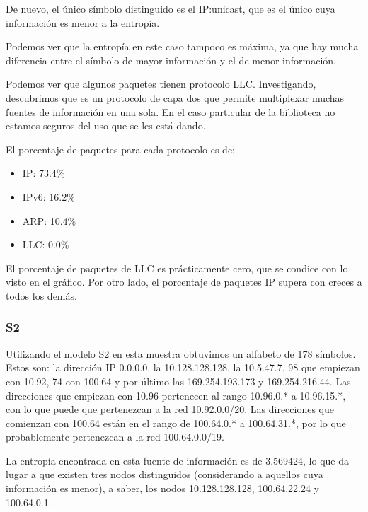
De nuevo, el único símbolo distinguido es el IP:unicast, que es el único cuya
información es menor a la entropía.

Podemos ver que la entropía en este caso tampoco es máxima, ya que hay mucha 
diferencia entre el símbolo de mayor información y el de menor información.

Podemos ver que algunos paquetes tienen protocolo LLC. Investigando, descubrimos
que es un protocolo de capa dos que permite multiplexar muchas fuentes de
información en una sola. En el caso particular de la biblioteca no
estamos seguros del uso que se les está dando.

El porcentaje de paquetes para cada protocolo es de:
\begin{itemize}
	\item IP: 73.4\%
	\item IPv6: 16.2\%
	\item ARP: 10.4\%
	\item LLC: 0.0\%
\end{itemize}

El porcentaje de paquetes de LLC es prácticamente cero, que se condice con lo
visto en el gráfico. Por otro lado, el porcentaje de paquetes IP supera con
creces a todos los demás.

\subsubsection{S2}

Utilizando el modelo S2 en esta muestra obtuvimos un
alfabeto de 178 símbolos. Estos son: la dirección IP 0.0.0.0, la 10.128.128.128,
la 10.5.47.7, 98 que empiezan con 10.92, 74 con 100.64 y por último
las 169.254.193.173 y 169.254.216.44. Las direcciones que empiezan con
10.96 pertenecen al rango 10.96.0.* a 10.96.15.*, con lo
que puede que pertenezcan a la red 10.92.0.0/20. Las direcciones que comienzan
con 100.64 están en el rango de 100.64.0.* a 100.64.31.*, por lo que
probablemente pertenezcan a la red 100.64.0.0/19.

La entropía encontrada en esta fuente de información es de 3.569424,
lo que da lugar a que existen tres nodos distinguidos (considerando a
aquellos cuya información es menor), a saber, los nodos
10.128.128.128, 100.64.22.24 y 100.64.0.1.

